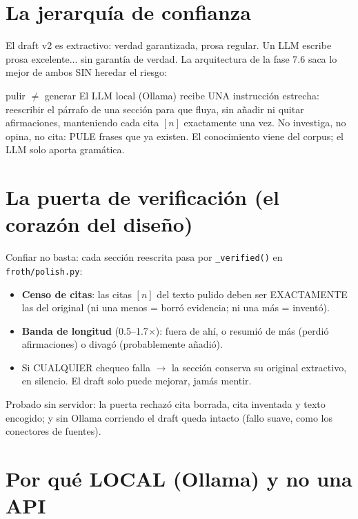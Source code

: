 \documentclass[11pt,a4paper]{article}
\begin{document}

\section{La jerarquía de confianza}

El draft v2 es extractivo: verdad garantizada, prosa regular. Un LLM escribe prosa
excelente... sin garantía de verdad. La arquitectura de la fase 7.6 saca lo mejor de
ambos SIN heredar el riesgo:

\begin{concepto}{pulir $\neq$ generar}
El LLM local (Ollama) recibe UNA instrucción estrecha: reescribir el párrafo de una
sección para que fluya, sin añadir ni quitar afirmaciones, manteniendo cada cita $[n]$
exactamente una vez. No investiga, no opina, no cita: PULE frases que ya existen.
El conocimiento viene del corpus; el LLM solo aporta gramática.
\end{concepto}

\section{La puerta de verificación (el corazón del diseño)}

Confiar no basta: cada sección reescrita pasa por \texttt{\_verified()} en
\texttt{froth/polish.py}:

\begin{itemize}
  \item \textbf{Censo de citas}: las citas $[n]$ del texto pulido deben ser EXACTAMENTE
        las del original (ni una menos = borró evidencia; ni una más = inventó).
  \item \textbf{Banda de longitud} (0.5--1.7$\times$): fuera de ahí, o resumió de más
        (perdió afirmaciones) o divagó (probablemente añadió).
  \item Si CUALQUIER chequeo falla $\rightarrow$ la sección conserva su original
        extractivo, en silencio. El draft solo puede mejorar, jamás mentir.
\end{itemize}

Probado sin servidor: la puerta rechazó cita borrada, cita inventada y texto encogido;
y sin Ollama corriendo el draft queda intacto (fallo suave, como los conectores de
fuentes).

\section{Por qué LOCAL (Ollama) y no una API}
\end{document}
